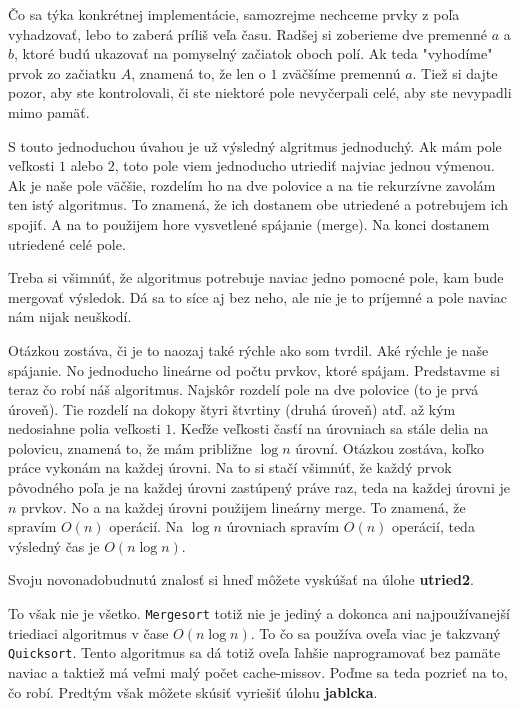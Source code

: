 Čo sa týka konkrétnej implementácie, samozrejme nechceme prvky z poľa vyhadzovať, lebo to zaberá
príliš veľa času. Radšej si zoberieme dve premenné $a$ a $b$, ktoré budú ukazovať na pomyselný
začiatok oboch polí. Ak teda "vyhodíme" prvok zo začiatku $A$, znamená to, že len o $1$ zväčšíme
premennú $a$. Tiež si dajte pozor, aby ste kontrolovali, či ste niektoré pole nevyčerpali celé, aby
ste nevypadli mimo pamäť.

S touto jednoduchou úvahou je už výsledný algritmus jednoduchý. Ak mám pole veľkosti $1$ alebo $2$,
toto pole viem jednoducho utriediť najviac jednou výmenou. Ak je naše pole väčšie, rozdelím ho na
dve polovice a na tie rekurzívne zavolám ten istý algoritmus. To znamená, že ich dostanem obe
utriedené a potrebujem ich spojiť. A na to použijem hore vysvetlené spájanie (merge). Na konci
dostanem utriedené celé pole.

Treba si všimnúť, že algoritmus potrebuje naviac jedno pomocné pole, kam bude mergovať výsledok. Dá
sa to síce aj bez neho, ale nie je to príjemné a pole naviac nám nijak neuškodí.

Otázkou zostáva, či je to naozaj také rýchle ako som tvrdil. Aké rýchle je naše spájanie. No
jednoducho lineárne od počtu prvkov, ktoré spájam. Predstavme si teraz čo robí náš algoritmus.
Najskôr rozdelí pole na dve polovice (to je prvá úroveň). Tie rozdelí na dokopy štyri štvrtiny
(druhá úroveň) atď. až kým nedosiahne polia veľkosti $1$. Keďže veľkosti časťí na úrovniach sa stále
delia na polovicu, znamená to, že mám približne $\log n$ úrovní. Otázkou zostáva, koľko práce
vykonám na každej úrovni. Na to si stačí všimnúť, že každý prvok pôvodného poľa je na každej úrovni
zastúpený práve raz, teda na každej úrovni je $n$ prvkov. No a na každej úrovni použijem lineárny
merge. To znamená, že spravím $O(n)$ operácií. Na $\log n$ úrovniach spravím $O(n)$ operácií, teda
výsledný čas je $O(n \log n)$.

\medskip

Svoju novonadobudnutú znalosť si hneď môžete vyskúšať na úlohe \textbf{utried2}.

\medskip

To však nie je všetko. \texttt{Mergesort} totiž nie je jediný a dokonca ani najpoužívanejší
triediaci algoritmus v čase $O(n \log n)$. To čo sa používa oveľa viac je takzvaný
\texttt{Quicksort}. Tento algoritmus sa dá totiž oveľa ľahšie naprogramovať bez pamäte naviac a
taktiež má veľmi malý počet cache-missov. Poďme sa teda pozrieť na to, čo robí. Predtým však môžete
skúsiť vyriešiť úlohu \textbf{jablcka}.

